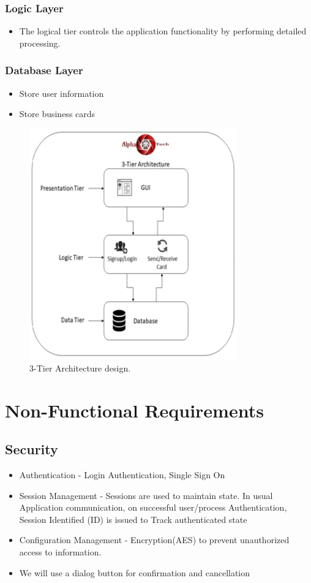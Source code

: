 \documentclass[english]{article}
\begin{document}
	\subsubsection{Logic Layer}
		\begin{itemize}
			\item 	The logical tier controls the application functionality by performing detailed processing.
		\end{itemize}
	\subsubsection{Database Layer}
		\begin{itemize}
			\item Store user information
			\item Store business cards	
		\end{itemize}
		
		
			\begin{figure}[ht!]
			\centering
			\includegraphics[width=90mm]{ArchitectureStyle.PNG}
			\caption{3-Tier Architecture design.}
		\end{figure}
	
	
	\section{Non-Functional Requirements}
	\subsection{Security}
	\begin{itemize}
		\item Authentication - Login Authentication, Single Sign On
		\item Session Management - Sessions are used to maintain state. In usual Application communication, on successful user/process Authentication, Session Identified (ID) is issued to Track authenticated state
		\item Configuration Management - Encryption(AES) to prevent unauthorized access to information.
		\item  We will use a dialog button for confirmation and cancellation	
	\end{itemize}
\end{document}

